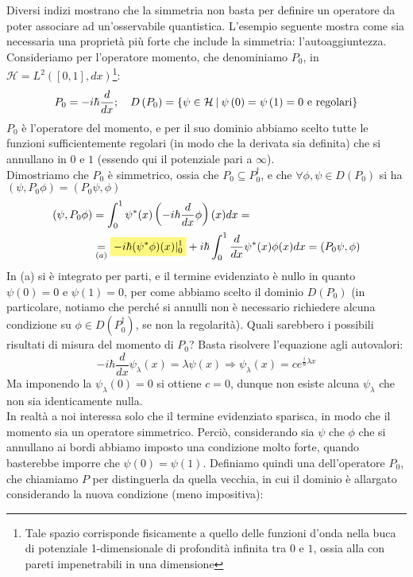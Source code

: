 \documentclass[../../FisicaTeorica.tex]{subfiles}
\begin{document}
Diversi indizi mostrano che la simmetria non basta per definire un operatore da poter associare ad un'osservabile quantistica. L'esempio seguente mostra come sia necessaria una proprietà più forte che include la simmetria: l'autoaggiuntezza.
Consideriamo  per l'operatore momento, che denominiamo $P_0$, in $\mathcal{H}=L^2(\left[0,1\right], dx)$\footnote{Tale spazio corrisponde fisicamente a quello delle funzioni d'onda nella buca di potenziale 1-dimensionale di profondità infinita tra $0$ e $1$, ossia alla  con pareti impenetrabili in una dimensione}:
\[
P_0=-i\hbar\frac{d}{dx};\quad D\left(P_0\right)=\left\{\psi \in \mathcal{H} \>|\> \psi\left(0\right)= \psi\left(1\right)=0\text{  e regolari}\right\}
\]
$P_0$ è l'operatore del momento, e per il suo dominio abbiamo scelto tutte le funzioni sufficientemente regolari (in modo che la derivata sia definita) che si annullano in $0$ e $1$ (essendo qui il potenziale pari a $\infty$).\\
Dimostriamo che $P_0$ è simmetrico, ossia che $P_0\subseteq P_0^\dag$, e che $\forall\phi, \psi\in D\left(P_0\right)$ si ha $\left(\psi, P_0\phi\right)=\left(P_0\psi, \phi\right)$
\begin{align*}
(\psi,P_0\phi) &= \int_0^1 \psi^*(x) \left ( -i\hbar \frac{d}{dx} \phi \right)(x) dx =\\
&\underset{(a)}{=} \hlc{Yellow}{-i\hbar (\psi^*\phi)(x)|_0^1} + i\hbar \int_0^1 \frac{d}{dx}\psi^*(x) \phi(x) dx = (P_0\psi, \phi)
\end{align*}
In (a) si è integrato per parti, e il termine evidenziato è nullo in quanto $\psi\left(0\right)=0$ e $\psi\left(1\right)= 0$, per come abbiamo scelto il dominio $D(P_0)$ (in particolare, notiamo che perché si annulli non è necessario richiedere alcuna condizione su $\phi \in D(P_0^\dag)$, se non la regolarità).
Quali sarebbero i possibili risultati di misura del momento di $P_0$? Basta risolvere l'equazione agli autovalori:
\[
-i\hbar\frac{d}{dx}\psi_\lambda\left(x\right)=\lambda\psi\left(x\right)\Rightarrow \psi_\lambda\left(x\right)=c e^{\frac{i}{\hbar}\lambda x}
\]
Ma imponendo la $\psi_\lambda\left(0\right)=0$ si ottiene $c=0$, dunque non esiste alcuna $\psi_\lambda$ che non sia identicamente nulla. \\
In realtà a noi interessa solo che il termine evidenziato sparisca, in modo che il momento sia un operatore simmetrico. Perciò, considerando sia $\psi$ che $\phi$ che si annullano ai bordi abbiamo imposto una condizione molto forte, quando basterebbe imporre che $\psi(0) = \psi(1)$. Definiamo quindi una  dell'operatore $P_0$, che chiamiamo $P$ per distinguerla da quella vecchia, in cui il dominio è allargato considerando la nuova condizione (meno impositiva):
\end{document}

